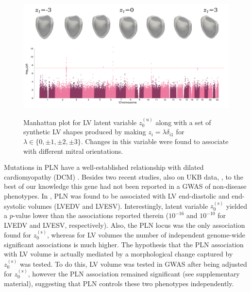\begin{figure}[ht!]
\includegraphics[width=\textwidth]{figs/gwas/GWAS_Experiment2_z1_unscaled_meshes.png}
\label{fig:manhattan_LV_latent_unscaled}
\caption{Manhattan plot for LV latent variable $z_0^{(\text{u})}$ along with a set of synthetic LV shapes produced by making $z_i=\lambda \delta_{i1}$ for $\lambda\in\{0, \pm 1, \pm 2, \pm 3\}$. Changes in this variable were found to associate with different mitral orientations.}
\end{figure}

Mutations in PLN have a well-established relationship with dilated cardiomyopathy (DCM) \cite{ref_Eijgenraam}. Besides two recent studies, also on UKB data, \cite{ref_pirruccello}, to the best of our knowledge this gene had not been reported in a GWAS of non-disease phenotypes. In \cite{ref_pirruccello}, PLN was found to be associated with LV end-diastolic and end-systolic volumes (LVEDV and LVESV). Interestingly, latent variable $z_0^{(\text{s})}$ yielded a $p$-value lower than the associations reported therein ($10^{-16}$ and $10^{-10}$ for LVEDV and LVESV, respectively). Also, the PLN locus was the only association found for $z_0^{(\text{s})}$, whereas for LV volumes the number of independent genome-wide significant associations is much higher. 
The hypothesis that the PLN association with LV volume is actually mediated by a morphological change captured by $z_0^{(\text{s})}$ was tested. To do this, LV volume was tested in GWAS after being adjusted for $z_0^{(\text{s})}$, however the PLN association remained significant (see supplementary material), suggesting that PLN controls these two phenotypes independently.

